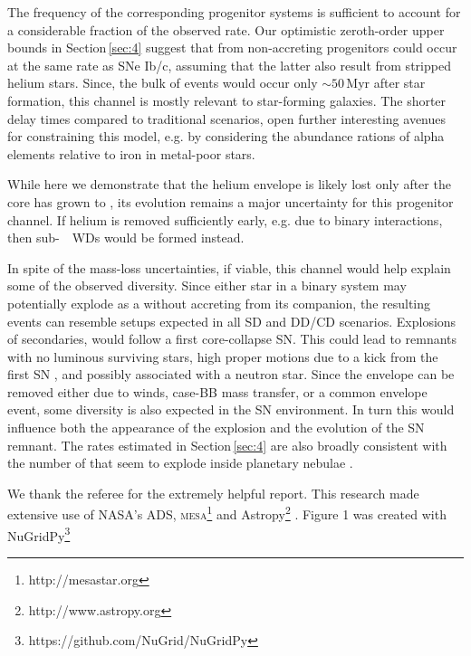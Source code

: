 \documentclass[twocolumn]{aa}
\begin{document}
The frequency of the corresponding progenitor systems 
is sufficient to account for a considerable fraction of the observed \ia  rate.  Our optimistic zeroth-order upper bounds in  Section\,\ref{sec:4} suggest that \ias from non-accreting progenitors could occur at the same rate as SNe Ib/c, assuming that the latter also result from stripped helium stars. Since, the bulk of events would occur only $\sim 50$\,Myr after star formation, this channel is mostly relevant to star-forming galaxies. The shorter delay times compared to traditional \ia scenarios, open further interesting avenues for constraining this model, e.g.  by considering the abundance rations of alpha elements relative to iron in metal-poor stars. 

 While here we demonstrate that the helium envelope is  likely lost only  after the core has grown to \mch, its evolution remains a major uncertainty for this progenitor channel. If helium is removed sufficiently early, e.g. due to binary interactions, then sub-\mch~\one\ WDs would be formed instead. 
 
In spite of the mass-loss 
uncertainties, if viable, this channel would help explain some of the observed \ia diversity. Since either star in a binary system may potentially explode 
as a \ia without accreting from its  companion, the resulting events can resemble setups expected in all SD and DD/CD scenarios. Explosions of 
secondaries, would follow a first core-collapse SN. This 
could lead to \ia remnants with no luminous surviving stars, high proper motions due to a kick from the first SN \cite[like the Kepler SN remnant,][]{Chiotellis:2011jy}, and  possibly associated with a neutron star. 
Since the  envelope can be removed either due to winds, case-BB mass transfer, or a common envelope event, some diversity is also expected in 
the SN environment. In turn this would influence both the 
appearance of the explosion and the evolution of the SN remnant. The rates estimated in Section\,\ref{sec:4} are also broadly consistent with the 
number of \ias that seem to explode inside planetary 
nebulae \citep[$\sim 20\%$;][]{Tsebrenko:2014kea}.  
          



\begin{acknowledgements}
We thank the referee for the extremely helpful report. 
 This research made extensive use of NASA's ADS, \textsc{mesa}\footnote{http://mesastar.org} \citep{Paxton:2010ji,Paxton:2013pj,Paxton:2015jva,Paxton:2017eie} and Astropy\footnote{http://www.astropy.org} \citep{Price-Whelan:2018hus}. Figure 1 was created with NuGridPy\footnote{https://github.com/NuGrid/NuGridPy}
\end{acknowledgements}


 

\end{document}
